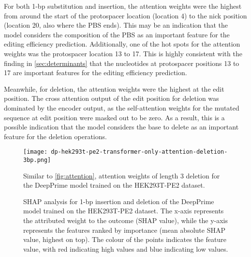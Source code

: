 For both 1-bp substitution and insertion, the attention weights were the highest from around the start of the protospacer location (location 4) to the nick position (location 20, also where the PBS ends). This may be an indication that the model considers the composition of the PBS as an important feature for the editing efficiency prediction. Additionally, one of the hot spots for the attention weights was the protospacer location 13 to 17. This is highly consistent with the finding in \autoref{sec:determinants} that the nucleotides at protospacer positions 13 to 17 are important features for the editing efficiency prediction.

Meanwhile, for deletion, the attention weights were the highest at the edit position. The cross attention output of the edit position for deletion was dominated by the encoder output, as the self-attention weights for the mutated sequence at edit position were masked out to be zero. As a result, this is a possible indication that the model considers the base to delete as an important feature for the deletion operations.

\begin{figure}
    \centering
    \texttt{[image: dp-hek293t-pe2-transformer-only-attention-deletion-3bp.png]}
    \caption[Attention weights for 3-bp deletion of the DeepPrime model trained on the HEK293T-PE2 dataset]{Similar to \autoref{fig:attention}, attention weights of length 3 deletion for the DeepPrime model trained on the HEK293T-PE2 dataset.}
    \label{fig:attention_deletion_3bp}
\end{figure}

\begin{figure}
    \caption[SHAP analysis for 1-bp insertion and deletion of the DeepPrime model trained on the HEK293T-PE2 dataset]{SHAP analysis for 1-bp insertion and deletion of the DeepPrime model trained on the HEK293T-PE2 dataset. The x-axis represents the attributed weight to the outcome (SHAP value), while the y-axis represents the features ranked by importance (mean absolute SHAP value, highest on top). The colour of the points indicates the feature value, with red indicating high values and blue indicating low values.}
    \label{fig:shap-1bp}
\end{figure}

